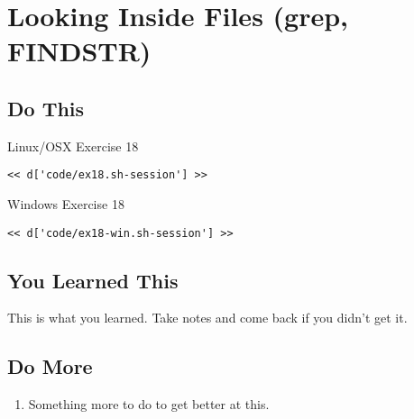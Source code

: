 \chapter{Looking Inside Files (grep, FINDSTR)}

\section{Do This}

\begin{code}{Linux/OSX Exercise 18}
\begin{Verbatim}
<< d['code/ex18.sh-session'] >>
\end{Verbatim}
\end{code}

\begin{code}{Windows Exercise 18}
\begin{Verbatim}
<< d['code/ex18-win.sh-session'] >>
\end{Verbatim}
\end{code}

\section{You Learned This}

This is what you learned.  Take notes and come back if you didn't get it.

\section{Do More}

\begin{enumerate}
\item Something more to do to get better at this.
\end{enumerate}

